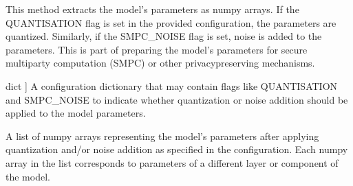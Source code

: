 \documentclass[letterpaper,10pt,english]{sphinxmanual}
\begin{document}
\begin{fulllineitems}
\begin{fulllineitems}
\sphinxAtStartPar
This method extracts the model’s parameters as numpy arrays. If the QUANTISATION flag is set in the provided
configuration, the parameters are quantized. Similarly, if the SMPC\_NOISE flag is set, noise is added to the
parameters. This is part of preparing the model’s parameters for secure multi\sphinxhyphen{}party computation (SMPC) or
other privacy\sphinxhyphen{}preserving mechanisms.
\begin{description}
\begin{description}
\sphinxlineitem{config}{[}dict  {]}
\sphinxAtStartPar
A configuration dictionary that may contain flags like QUANTISATION and SMPC\_NOISE to indicate whether quantization or noise addition should be applied to the model parameters.

\end{description}

\begin{description}
\sphinxAtStartPar
A list of numpy arrays representing the model’s parameters after applying quantization and/or noise addition as specified in the configuration. Each numpy array in the list corresponds to parameters of a different layer or component of the model.

\end{description}

\begin{sphinxVerbatim}[commandchars=\\\{\}]
  
     
  
\PYG{p}{[}\PYG{p}{]}
\end{sphinxVerbatim}


\end{description}
\end{fulllineitems}
\end{fulllineitems}
\end{document}
